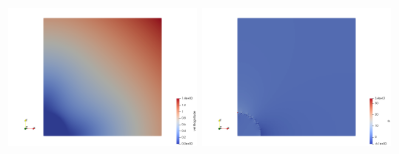 \begin{center}
\includegraphics[width=5cm]{python_codes/fieldstone_78/results/exp14/vel}
\includegraphics[width=5cm]{python_codes/fieldstone_78/results/exp14/p}
\end{center}


